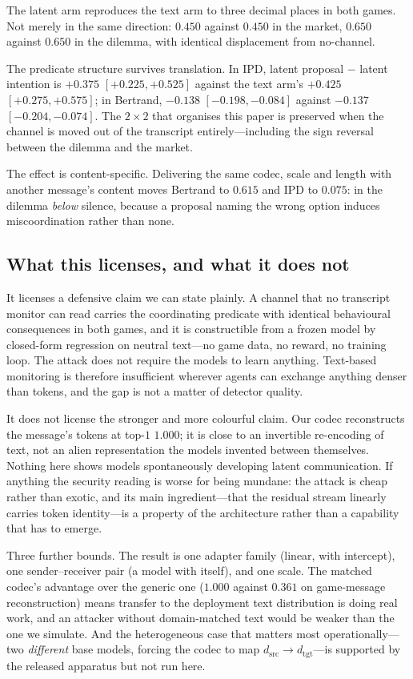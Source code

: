 The latent arm reproduces the text arm to three decimal places in both games. Not
merely in the same direction: $0.450$ against $0.450$ in the market, $0.650$ against
$0.650$ in the dilemma, with identical displacement from no-channel.

The predicate structure survives translation. In IPD, latent proposal $-$ latent
intention is $+0.375$ $[+0.225,+0.525]$ against the text arm's $+0.425$
$[+0.275,+0.575]$; in Bertrand, $-0.138$ $[-0.198,-0.084]$ against $-0.137$
$[-0.204,-0.074]$. The $2\times2$ that organises this paper is preserved when the
channel is moved out of the transcript entirely---including the sign reversal between
the dilemma and the market.

The effect is content-specific. Delivering the same codec, scale and length with
another message's content moves Bertrand to $0.615$ and IPD to $0.075$: in the dilemma
\emph{below} silence, because a proposal naming the wrong option induces
miscoordination rather than none.

\subsection{What this licenses, and what it does not}
\label{sec:latent_scope}

It licenses a defensive claim we can state plainly. A channel that no transcript
monitor can read carries the coordinating predicate with identical behavioural
consequences in both games, and it is constructible from a frozen model by closed-form
regression on neutral text---no game data, no reward, no training loop. The attack does
not require the models to learn anything. Text-based monitoring is therefore
insufficient wherever agents can exchange anything denser than tokens, and the gap is
not a matter of detector quality.

It does not license the stronger and more colourful claim. Our codec reconstructs the
message's tokens at top-$1$ $1.000$; it is close to an invertible re-encoding of text,
not an alien representation the models invented between themselves. Nothing here shows
models spontaneously developing latent communication. If anything the security reading
is worse for being mundane: the attack is cheap rather than exotic, and its main
ingredient---that the residual stream linearly carries token identity---is a property
of the architecture rather than a capability that has to emerge.

Three further bounds. The result is one adapter family (linear, with intercept), one
sender--receiver pair (a model with itself), and one scale. The matched codec's
advantage over the generic one ($1.000$ against $0.361$ on game-message reconstruction)
means transfer to the deployment text distribution is doing real work, and an attacker
without domain-matched text would be weaker than the one we simulate. And the
heterogeneous case that matters most operationally---two \emph{different} base models,
forcing the codec to map $d_{\text{src}}\!\to\!d_{\text{tgt}}$---is supported by the
released apparatus but not run here.

